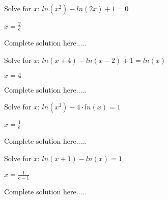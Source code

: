 \newpage
\begin{example}
Solve for $x$: $ln(x^2)-ln(2x)+1=0$

    \begin{sol}
    $x=\displaystyle\frac{2}{e}$
    \end{sol}
    \begin{solL}
    Complete solution here.....
    
    \end{solL}
    
\end{example}
\begin{example}
Solve for $x$: $ln(x+4)-ln(x-2)+1=ln(x)$

    \begin{sol}
    $x=4$
    \end{sol}
    \begin{solL}
    Complete solution here.....
    
    \end{solL}
    
\end{example}
\begin{example}
Solve for $x$: $ln(x^3)-4\cdot ln(x)=1$

    \begin{sol}
    $x=\displaystyle\frac{1}{e}$
    \end{sol}
    \begin{solL}
    Complete solution here.....
    
    \end{solL}
    
\end{example}
\begin{example}
Solve for $x$: $ln(x+1)-ln(x)=1$

    \begin{sol}
    $x=\displaystyle\frac{1}{e-1}$
    \end{sol}
    \begin{solL}
    Complete solution here.....
    
    \end{solL}
    
\end{example}
